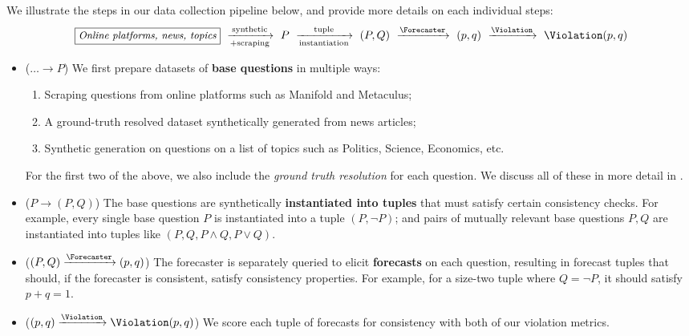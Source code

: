 We illustrate the steps in our data collection pipeline below, and provide more details on each individual steps:
%
\begin{equation*}
    \fbox{\text{\small\emph{Online platforms, news, topics}}}\ \xrightarrow[\text{+scraping}]{\text{synthetic}}\ P\ \xrightarrow[\text{instantiation}]{\text{tuple}}\ (P,Q)\ \xrightarrow{\Forecaster}\ (p,q)\ \xrightarrow{\Violation}\ \Violation(p,q)
\end{equation*}

\begin{itemize}
    \item ($\dots\longrightarrow P$) We first prepare datasets of \textbf{base questions} in multiple ways:
    \begin{enumerate}[label=(\alph*)]
        \item Scraping questions from online platforms such as Manifold and Metaculus;
        \item A ground-truth resolved dataset synthetically generated from news articles;
        \item Synthetic generation on questions on a list of topics such as Politics, Science, Economics, etc.
    \end{enumerate}
    For the first two of the above, we also include the \emph{ground truth resolution} for each question.
    We discuss all of these in more detail in .
    \item ($P\longrightarrow (P, Q)$) The base questions are synthetically \textbf{instantiated into tuples} that must satisfy certain consistency checks. For example, every single base question $P$ is instantiated into a tuple $(P,\lnot P)$; and pairs of mutually relevant base questions $P,Q$ are instantiated into tuples like $(P,Q,P\land Q,P\lor Q)$.
    \item ($(P,Q)\xrightarrow{\Forecaster}(p,q)$) The forecaster is separately queried to elicit \textbf{forecasts} on each question, resulting in forecast tuples that should, if the forecaster is consistent, satisfy consistency properties.  For example, for a size-two tuple where $Q = \neg P$, it should satisfy $p+q=1$.
    \item ($(p,q)\xrightarrow{\Violation}\Violation(p,q)$) We score each tuple of forecasts for consistency with both of our violation metrics.
\end{itemize}


